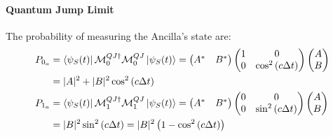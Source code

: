 \documentclass[a4paper,12pt]{article}
\begin{document}
\paragraph{Quantum Jump Limit}
The probability of measuring the Ancilla's state are:
\begin{align}
	P_{0_{a}} &= \bra{\psi_{S} (t)} \mathcal{M}_{0}^{QJ \dagger} \mathcal{M}_{0}^{QJ} \ket{\psi_{S}(t)} = \begin{pmatrix} A^{*} & B^{*} \end{pmatrix} \begin{pmatrix} 1 & 0 \\ 0 & \cos^{2} \left(c \Delta t \right) \end{pmatrix} \begin{pmatrix} A \\ B \end{pmatrix} \notag \\
	&= | A |^{2} + | B |^{2} \cos^{2} \left(c \Delta t \right) \\
	P_{1_{a}} &= \bra{\psi_{S} (t)} \mathcal{M}_{1}^{QJ \dagger} \mathcal{M}_{1}^{QJ} \ket{\psi_{S}(t)} = \begin{pmatrix} A^{*} & B^{*} \end{pmatrix} \begin{pmatrix} 0 & 0 \\ 0 & \sin^{2} \left(c \Delta t \right) \end{pmatrix} \begin{pmatrix} A \\ B \end{pmatrix} \notag \\
	&= | B |^{2} \sin^{2} \left(c \Delta t \right) = | B |^{2} \left(1 - \cos^{2} \left(c \Delta t \right) \right) 
\end{align}
\end{document}

